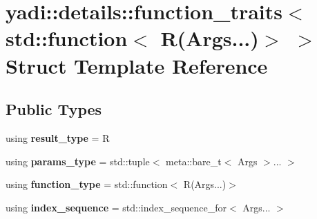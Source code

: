 \hypertarget{structyadi_1_1details_1_1function__traits_3_01std_1_1function_3_01_r_07_args_8_8_8_08_4_01_4}{}\section{yadi\+:\+:details\+:\+:function\+\_\+traits$<$ std\+:\+:function$<$ R(Args...)$>$ $>$ Struct Template Reference}
\label{structyadi_1_1details_1_1function__traits_3_01std_1_1function_3_01_r_07_args_8_8_8_08_4_01_4}
\subsection*{Public Types}
\begin{DoxyCompactItemize}
\item 
\mbox{\label{structyadi_1_1details_1_1function__traits_3_01std_1_1function_3_01_r_07_args_8_8_8_08_4_01_4_ac068b05439b1192cd569fa36f2dfc27a}} 
using {\bfseries result\+\_\+type} = R
\item 
\mbox{\label{structyadi_1_1details_1_1function__traits_3_01std_1_1function_3_01_r_07_args_8_8_8_08_4_01_4_a3f7c503ebb6e36d7dfabb9f172fa45a3}} 
using {\bfseries params\+\_\+type} = std\+::tuple$<$ meta\+::bare\+\_\+t$<$ Args $>$... $>$
\item 
\mbox{\label{structyadi_1_1details_1_1function__traits_3_01std_1_1function_3_01_r_07_args_8_8_8_08_4_01_4_a736c672a78223b1be22be46ed7910c78}} 
using {\bfseries function\+\_\+type} = std\+::function$<$ R(Args...)$>$
\item 
\mbox{\label{structyadi_1_1details_1_1function__traits_3_01std_1_1function_3_01_r_07_args_8_8_8_08_4_01_4_ada4af304d47ba359182ee23002f372e1}} 
using {\bfseries index\+\_\+sequence} = std\+::index\+\_\+sequence\+\_\+for$<$ Args... $>$
\end{DoxyCompactItemize}


